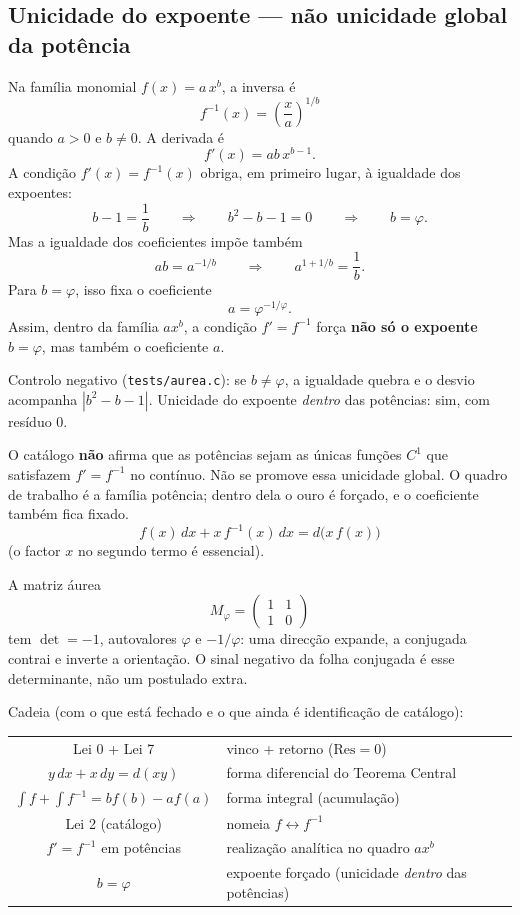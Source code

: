 \documentclass[11pt,a4paper]{article}
\begin{document}
\subsection{Unicidade do expoente --- não unicidade global da potência}

Na família monomial $f(x)=a\,x^b$, a inversa é
\[
 f^{-1}(x)=\left(\frac{x}{a}\right)^{1/b}
\]
quando $a>0$ e $b\neq 0$. A derivada é
\[
 f'(x)=ab\,x^{b-1}.
\]
A condição $f'(x)=f^{-1}(x)$ obriga, em primeiro lugar, à igualdade dos expoentes:
\[
 b-1=\frac1b
\qquad\Longrightarrow\qquad
b^2-b-1=0
\qquad\Longrightarrow\qquad
b=\varphi.
\]
Mas a igualdade dos coeficientes impõe também
\[
 ab=a^{-1/b}
\qquad\Longrightarrow\qquad
a^{1+1/b}=\frac1b.
\]
Para $b=\varphi$, isso fixa o coeficiente
\[
 a=\varphi^{-1/\varphi}.
\]
Assim, dentro da família $a x^b$, a condição $f'=f^{-1}$ força \textbf{não só o expoente} $b=\varphi$, mas também o coeficiente $a$.

Controlo negativo (\texttt{tests/aurea.c}): se $b\neq\varphi$, a igualdade quebra e o desvio
acompanha $|b^2-b-1|$. Unicidade do expoente \emph{dentro} das potências: sim, com resíduo 0.

O catálogo \textbf{não} afirma que as potências sejam as únicas funções $C^1$ que satisfazem
$f'=f^{-1}$ no contínuo. Não se promove essa unicidade global. O quadro de trabalho é
a família potência; dentro dela o ouro é forçado, e o coeficiente também fica fixado.
\[
f(x)\,dx+x\,f^{-1}(x)\,dx=d\bigl(x\,f(x)\bigr)
\]
(o factor $x$ no segundo termo é essencial).

A matriz áurea
\[
M_\varphi=\begin{pmatrix}1&1\\1&0\end{pmatrix}
\]
tem $\det=-1$, autovalores $\varphi$ e $-1/\varphi$: uma direcção expande, a conjugada
contrai e inverte a orientação. O sinal negativo da folha conjugada é esse determinante,
não um postulado extra.

Cadeia (com o que está fechado e o que ainda é identificação de catálogo):
\begin{center}
\renewcommand{\arraystretch}{1.3}
\begin{tabular}{@{}cl@{}}
Lei 0 + Lei 7 & vinco + retorno ($\mathrm{Res}=0$) \\
$y\,dx+x\,dy=d(xy)$ & forma diferencial do Teorema Central \\
$\displaystyle\int f+\int f^{-1}=bf(b)-af(a)$ & forma integral (acumulação) \\
Lei 2 (catálogo) & nomeia $f\leftrightarrow f^{-1}$ \\
$f'=f^{-1}$ em potências & realização analítica no quadro $ax^b$ \\
$b=\varphi$ & expoente forçado (unicidade \emph{dentro} das potências) \\
\end{tabular}
\end{center}
\end{document}
